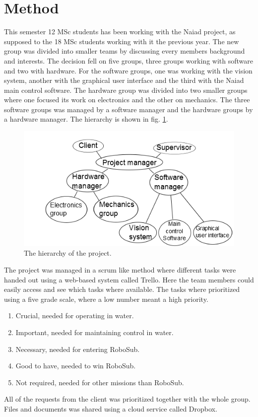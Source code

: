 \section{Method}
This semester 12 MSc students has been working with the Naiad project, as supposed to the 18 MSc students working with it the previous year. The new group was divided into smaller teams by discussing every members background and interests. The decision fell on five groups, three groups working with software and two with hardware. For the software groups, one was working with the vision system, another with the graphical user interface and the third with the Naiad main control software. The hardware group was divided into two smaller groups where one focused its work on electronics and the other on mechanics. The three software groups was managed by a software manager and the hardware groups by a hardware manager. The hierarchy is shown in fig. \ref{hierarchy}.
\begin{figure}[!ht]
	\begin{center}
		\includegraphics[width=120mm]{./Images/Method/hierarchy.png}
		\caption{The hierarchy of the project.}
		\label{hierarchy}
	\end{center}
\end{figure}

The project was managed in a scrum like method where different tasks were handed out using a web-based system called Trello\cite{trello}. Here the team members could easily access and see which tasks where available. The tasks where prioritized using a five grade scale, where a low number meant a high priority.
\begin{enumerate}
\item Crucial, needed for operating in water.
\item Important, needed for maintaining control in water. 
\item Necessary, needed for entering RoboSub.  
\item Good to have, needed to win RoboSub. 
\item Not required, needed for other missions than RoboSub. 
\end{enumerate}
All of the requests from the client was prioritized together with the whole group. Files and documents was shared using a cloud service called Dropbox\cite{dropbox}. 

